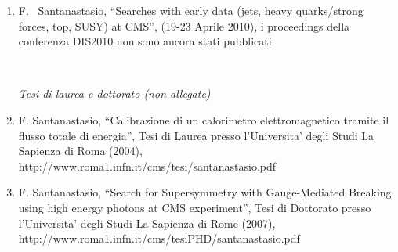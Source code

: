 \documentclass[10pt]{letter}
\begin{document}
\begin{enumerate}
\item F. ~Santanastasio, ``Searches with early data (jets, heavy quarks/strong forces, top, SUSY) at CMS'', 
(19-23 Aprile 2010), i proceedings della conferenza DIS2010 non sono ancora stati pubblicati


~\\
\begin{center} \textit{Tesi di laurea e dottorato (non allegate)} \\  \end{center}

\item F. Santanastasio, ``Calibrazione di un calorimetro elettromagnetico tramite il flusso totale di energia'', Tesi di Laurea presso l'Universita' degli Studi La Sapienza di Roma (2004), \\ http://www.roma1.infn.it/cms/tesi/santanastasio.pdf 
\item F. Santanastasio, ``Search for Supersymmetry with Gauge-Mediated Breaking using high energy photons at CMS experiment'', Tesi di Dottorato presso l'Universita' degli Studi La Sapienza di Rome (2007),\\ http://www.roma1.infn.it/cms/tesiPHD/santanastasio.pdf 


\end{enumerate}
\end{document}
